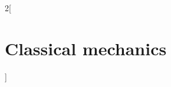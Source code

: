 \documentclass[../../../main.tex]{subfiles}
\begin{document}
\begin{multicols}{2}[\section{Classical mechanics}]

\end{multicols}
\end{document}
